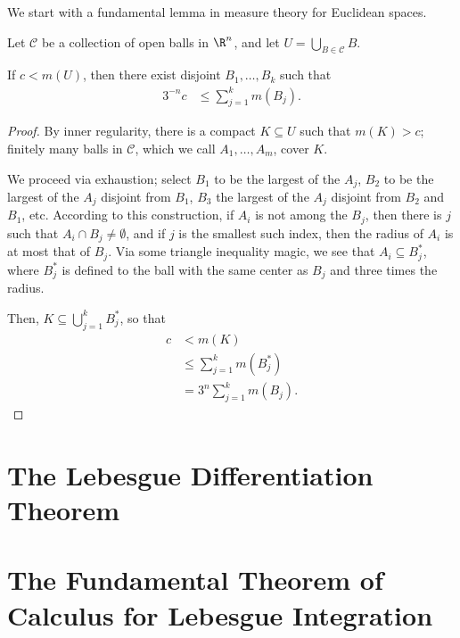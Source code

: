 \documentclass[10pt]{mypackage}
\begin{document}
We start with a fundamental lemma in measure theory for Euclidean spaces.
\begin{theorem}
  Let $\mathcal{C}$ be a collection of open balls in $\R^n$, and let $U = \bigcup_{B\in \mathcal{C}} B$.\newline

  If $c < m\left( U \right)$, then there exist disjoint $B_1,\dots,B_k$ such that
  \begin{align*}
    3^{-n} c &\leq \sum_{j=1}^{k} m\left( B_j \right).
  \end{align*}
\end{theorem}
\begin{proof}
  By inner regularity, there is a compact $K\subseteq U$ such that $m(K) > c$; finitely many balls in $\mathcal{C}$, which we call $A_1,\dots,A_m$, cover $K$.\newline

  We proceed via exhaustion; select $B_1$ to be the largest of the $A_j$, $B_2$ to be the largest of the $A_j$ disjoint from $B_1$, $B_3$ the largest of the $A_j$ disjoint from $B_2$ and $B_1$, etc. According to this construction, if $A_i$ is not among the $B_j$, then there is $j$ such that $A_i\cap B_j \neq \emptyset$, and if $j$ is the smallest such index, then the radius of $A_i$ is at most that of $B_j$. Via some triangle inequality magic, we see that $A_i\subseteq B_j^{\ast}$, where $B_j^{\ast}$ is defined to the ball with the same center as $B_j$ and three times the radius.\newline

  Then, $K\subseteq \bigcup_{j=1}^{k}B_j^{\ast}$, so that
  \begin{align*}
    c &< m(K)\\
      &\leq \sum_{j=1}^{k} m\left( B_j^{\ast} \right)\\
      &= 3^{n} \sum_{j=1}^{k} m\left( B_j \right).
  \end{align*}
\end{proof}
\section{The Lebesgue Differentiation Theorem}%

\section{The Fundamental Theorem of Calculus for Lebesgue Integration}%
\end{document}
